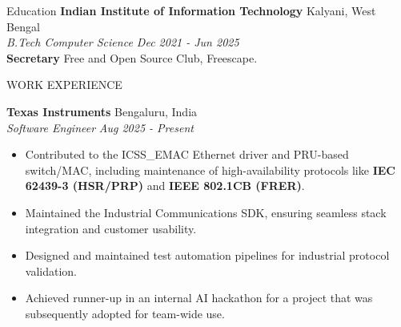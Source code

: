 \documentclass{resume} %
\begin{document}
\begin{rSection}{Education}
	{\bf Indian Institute of Information Technology}  \hfill {Kalyani, West Bengal}\\
	\textit{B.Tech Computer Science \hfill {Dec 2021 - Jun 2025}}\\
	\textbf{Secretary} Free and Open Source Club, Freescape.
\end{rSection}


\begin{rSection}{WORK EXPERIENCE}

	\textbf{Texas Instruments} \hfill Bengaluru, India\\
	\textit{Software Engineer} \hfill \textit{Aug 2025 - Present}
	\begin{itemize}
		\item Contributed to the ICSS\_EMAC Ethernet driver and PRU-based switch/MAC, including maintenance of high-availability protocols like \textbf{IEC 62439-3 (HSR/PRP)} and \textbf{IEEE 802.1CB (FRER)}.
		\item Maintained the Industrial Communications SDK, ensuring seamless stack integration and customer usability.
		\item Designed and maintained test automation pipelines for industrial protocol validation.
		\item Achieved runner-up in an internal AI hackathon for a project that was subsequently adopted for team-wide use.
	\end{itemize}


\end{rSection}
\end{document}
